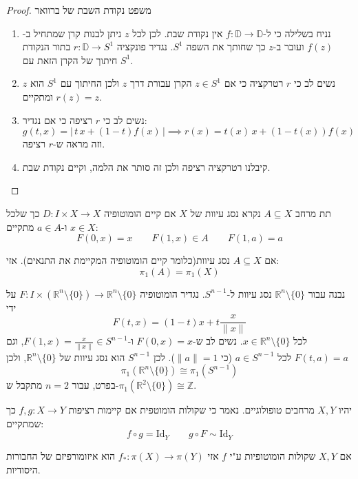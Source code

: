 \documentclass{tstextbook}
\begin{document}
\begin{proof}
משפט נקודת השבת של ברוואר

  \begin{enumerate}
    \item נניח בשלילה כי ל-\(f:\mathbb{D\to D}\) אין נקודת שבת. לכן לכל \(z\) ניתן לבנות קרן שמתחיל ב-\(f(z)\) ועובר ב-\(z\) כך שחותך את השפה \(S^{1}\). נגדיר פונקציה \(r:\mathbb{D}\to S^{1}\) בתור הנקודת חיתוך של הקרן הזאת עם \(S^{1}\). 


    \item נשים לב כי \(r\) רטרקציה כי אם \(z \in S^{1}\) הקרן עבורת דרך \(z\) ולכן החיתוך עם \(S^{1}\) הוא \(z\) ומתקיים \(r(z)=z\). 


    \item נשים לב כי \(r\) רציפה כי אם נגדיר: 
$$g(t,x)=|\,t\,x+(1-t)f(x)\,|\implies r(x)=t(x)\,x+(1-t(x))f(x)$$
וזה מראה ש-\(r\) רציפה.


    \item קיבלנו רטרקציה רציפה ולכן זה סותר את הלמה, וקיים נקודת שבת. 


  \end{enumerate}
\end{proof}
\begin{definition}
תת מרחב \(A\subseteq X\) נקרא נסג עיוות של \(X\) אם קיים הומוטופיה \(D:I\times X\to X\) כך שלכל \(x \in X\) ו-\(a \in A\) מתקיים:
$$F(0,x)=x\qquad F(1,x)\in A\qquad F(1,a)=a$$

\end{definition}
\begin{proposition}
אם \(A\subseteq X\) נסג עיוות(כלומר קיים הומוטופיה המקיימת את התנאים). אזי:
$$\pi_{1}(A)=\pi_{1}(X)$$

\end{proposition}
\begin{example}
נבנה עבור \(\mathbb{R}^n \setminus \{0\}\) נסג עיוות ל-\(S^{n-1}\). נגדיר הומוטופיה \(F : I \times (\mathbb{R}^n \setminus \{0\}) \to \mathbb{R}^n \setminus \{0\}\) על ידי
$$F(t, x) = (1-t)x + t\frac{x}{\|x\|}$$
לכל \(x \in \mathbb{R}^n \setminus \{0\}\). נשים לב ש-\(F(0, x) = x\) ו-\(F(1, x) = \frac{x}{\|x\|} \in S^{n-1}\), וגם \(F(t, a) = a\) לכל \(a \in S^{n-1}\) (כי \(\|a\|=1\)). לכן \(S^{n-1}\) הוא נסג עיוות של \(\mathbb{R}^n \setminus \{0\}\), ולכן
$$\pi_1(\mathbb{R}^n \setminus \{0\}) \cong \pi_1(S^{n-1})$$
בפרט, עבור \(n=2\) מתקבל ש-\(\pi_1(\mathbb{R}^2 \setminus \{0\}) \cong \mathbb{Z}\).

\end{example}
\begin{definition}
יהיו \(X,Y\) מרחבים טופולוגיים. נאמר כי שקולות הומוטפית אם קיימות רציפות \(f,g:X\to Y\) כך שמתקיים:
$$f\circ  g = \mathrm{Id}_{Y}\qquad g\circ  F \sim \mathrm{Id}_{Y}$$

\end{definition}
\begin{proposition}
אם \(X,Y\) שקולות הומוטופיות ע"י \(f\) אזי \(f_{*}:\pi(X)\to \pi(Y)\) הוא איזומורפיזם של החבורות היסודיות.

\end{proposition}
\end{document}
